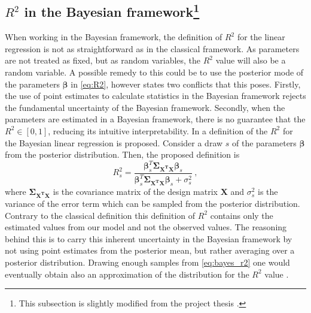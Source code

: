 \subsection{$R^2$ in the Bayesian framework\protect\footnote{This subsection is slightly modified from the project thesis \citep{Arnstad}.}}
\label{sec:bayes_R2}
When working in the Bayesian framework, the definition of $R^2$ for the linear regression is not as straightforward as in the classical framework. As parameters are not treated as fixed, but as random variables, the $R^2$ value will also be a random variable. A possible remedy to this could be to use the posterior mode of the parameters $\boldsymbol{\beta}$ in \eqref{eq:R2}, however \citet{gelman2017rsquared} states two conflicts that this poses. Firstly, the use of point estimates to calculate statistics in the Bayesian framework rejects the fundamental uncertainty of the Bayesian framework. Secondly, when the parameters are estimated in a Bayesian framework, there is no guarantee that the $R^2 \in [0, 1]$, reducing its intuitive interpretability. 
In \citet{gelman2017rsquared} a definition of the $R^2$ for the Bayesian linear regression is proposed. Consider a draw $s$ of the parameters $\boldsymbol{\beta}$ from the posterior distribution. Then, the proposed definition is
\begin{equation}
    \label{eq:bayes_r2}
    R_s^2 = \frac{\boldsymbol{\beta}_s^T \boldsymbol{\Sigma_{\mathbf{X^TX}}}\boldsymbol{\beta}_s}{\boldsymbol{\beta}_s^T \boldsymbol{\Sigma_{\mathbf{X^TX}}}\boldsymbol{\beta}_s + \sigma^2_s} \ ,
\end{equation}
where $\boldsymbol{\Sigma_{\mathbf{X^TX}}}$ is the covariance matrix of the design matrix $\mathbf{X}$ and $\sigma^2_s$ is the variance of the error term which can be sampled from the posterior distribution.
Contrary to the classical definition this definition of $R^2$ contains only the estimated values from our model and not the observed values. The reasoning behind this is to carry this inherent uncertainty in the Bayesian framework by not using point estimates from the posterior mean, but rather averaging over a posterior distribution. %
Drawing enough samples from \eqref{eq:bayes_r2} one would eventually obtain also an approximation of the distribution for the $R^2$ value \citep{gelman2017rsquared}.










